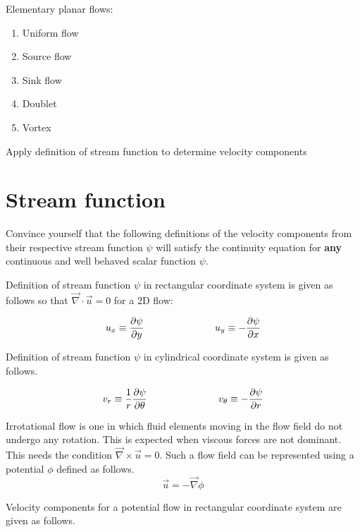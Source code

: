 Elementary planar flows: 
\begin{enumerate}
\item Uniform flow
\item Source flow
\item Sink flow
\item Doublet
\item Vortex
\end{enumerate}


\begin {lo3} 
Apply definition of stream function to determine velocity components
\end {lo3}

\section{Stream function}


Convince yourself that the following definitions of the velocity components from their respective stream function $\psi$ will satisfy the continuity equation for {\bf any} continuous and well behaved scalar function $\psi$.

Definition of stream function $\psi$ in rectangular coordinate system is given as follows so that $\vec{\nabla} \cdot \vec{u} = 0$ for a 2D flow:

$$ u_x \equiv {\partial \psi \over \partial y} \hspace{1 in} u_y \equiv -{\partial \psi \over \partial x}$$

Definition of stream function $\psi$ in cylindrical coordinate system is given as follows.

$$ v_r \equiv {1 \over r}{\partial \psi \over \partial \theta} \hspace{1 in} v_\theta \equiv -{\partial \psi \over \partial r}$$

Irrotational flow is one in which fluid elements moving in the flow field do not undergo any rotation. This is expected when viscous forces are not dominant. This needs the condition $\vec{\nabla} \times \vec{u} =0$. Such a flow field can be represented using a potential $\phi$ defined as follows.
$$ \vec{u} = -\vec{\nabla} \phi$$

Velocity components for a potential flow in rectangular coordinate system are given as follows.

